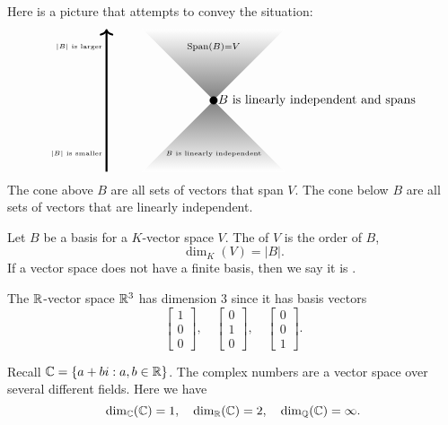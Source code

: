 \documentclass{ximera}
\begin{document}
Here is a picture that attempts to convey the situation:
\[
\begin{tikzpicture}
  \draw[white,thin,shading = axis, top color = white, bottom color = gray] (-2,2) -- (0,0)-- (2,2) -- (-2,2) -- cycle;
  \draw[white,thin,shading = axis, bottom color = white, top color = gray] (-2,-2) -- (0,0)-- (2,-2) -- (-2,-2) -- cycle;
  \filldraw (0,0) circle (3pt);
  \node[right] at (0,0) {$B$ is linearly independent and spans};
  \node at (0,1.5) {$\scriptstyle \Span(B) = V$};
  \node at (0,-1.5) {\tiny $B$  is linearly independent};
  \draw[->,ultra thick] (-3,-2) -- (-3,2);
  \node[left] at (-3,-1.5) {\text{\tiny $|B|$ is smaller}};
  \node[left] at (-3,1.5) {\text{\tiny $|B|$ is larger}};
\end{tikzpicture}
\]
The cone above $B$ are all sets of vectors that span $V$. The cone
below $B$ are all sets of vectors that are linearly independent.



\begin{definition}
  Let $B$ be a basis for a $K$-vector space $V$. The  of $V$ is the order of $B$,
  \[
  \dim_K(V) = |B|.
  \]
  If a vector space does not have a finite basis, then we say it is
  .
\end{definition}


\begin{example}
  The $\mathbb R$-vector space $\mathbb R^3$ has dimension $3$ since it has basis vectors
  \[
  \begin{bmatrix}
    1\\
    0\\
    0
  \end{bmatrix},\quad
  \begin{bmatrix}
    0\\
    1\\
    0
  \end{bmatrix},\quad
   \begin{bmatrix}
    0\\
    0\\
    1
  \end{bmatrix}.
  \]
\end{example}


\begin{example}
   Recall $\mathbb C = \{a+bi:a,b\in\mathbb R\}$. The complex numbers are a vector
   space over several different fields. Here we have
  \[
  \dim_{\mathbb C}(\mathbb C) = 1, \quad \dim_{\mathbb R}(\mathbb C) = 2, \quad \dim_{\mathbb Q}(\mathbb C) =\infty.
  \]
\end{example}
\end{document}
